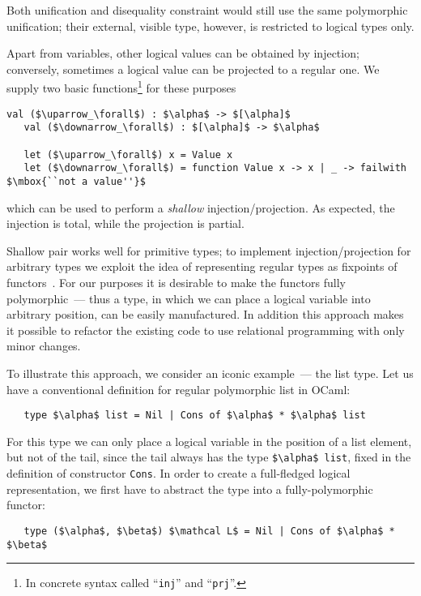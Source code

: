 Both unification and disequality constraint would still use the same polymorphic unification; their external, visible type,
however, is restricted to logical types only.

Apart from variables, other logical values can be obtained by injection; conversely, sometimes a logical value can be projected to
a regular one. We supply two basic functions\footnote{In concrete syntax called ``\lstinline{inj}'' and ``\lstinline{prj}''.}
for these purposes

\begin{lstlisting}[mathescape=true]
   val ($\uparrow_\forall$) : $\alpha$ -> $[\alpha]$
   val ($\downarrow_\forall$) : $[\alpha]$ -> $\alpha$

   let ($\uparrow_\forall$) x = Value x
   let ($\downarrow_\forall$) = function Value x -> x | _ -> failwith $\mbox{``not a value''}$
\end{lstlisting}

\noindent which can be used to perform a \emph{shallow} injection/projection. As expected, the injection is total, while the projection is partial.

Shallow pair works well for primitive types; to implement injection/projection for arbitrary types we exploit the 
idea of representing regular types as fixpoints of functors~\cite{ALaCarte}. For our purposes it is desirable to make
the functors fully polymorphic~--- thus a type, in which we can place a logical variable into arbitrary position,
can be easily manufactured. In addition this approach makes it possible to refactor the existing code to use relational
programming with only minor changes.

To illustrate this approach, we consider an iconic example~--- the list type. Let us have a conventional definition
for regular polymorphic list in OCaml:

\begin{lstlisting}
   type $\alpha$ list = Nil | Cons of $\alpha$ * $\alpha$ list
\end{lstlisting} 

For this type we can only place a logical variable in the position of a list element, but not of the tail, since the tail
always has the type \lstinline{$\alpha$ list}, fixed in the definition of constructor \lstinline{Cons}. In order to create 
a full-fledged logical representation, we first have to abstract the type into a fully-polymorphic functor:

\begin{lstlisting}
   type ($\alpha$, $\beta$) $\mathcal L$ = Nil | Cons of $\alpha$ * $\beta$
\end{lstlisting}

